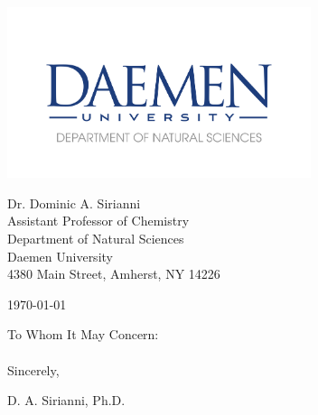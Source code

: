 

\pagestyle{empty}

\begin{center}
\includegraphics[width=3.5in]{natsci_letterhead_logo.png}
\end{center}
\vspace{-0.5cm}
{\noindent Dr. Dominic A. Sirianni\\
Assistant Professor of Chemistry\\
Department of Natural Sciences\\
Daemen University\\
4380 Main Street, Amherst, NY 14226

\hspace*{\fill}\today
}


\noindent To Whom It May Concern:\\

\\

\noindent Sincerely,

\vspace{1.5 cm}

\noindent D. A. Sirianni, Ph.D.



